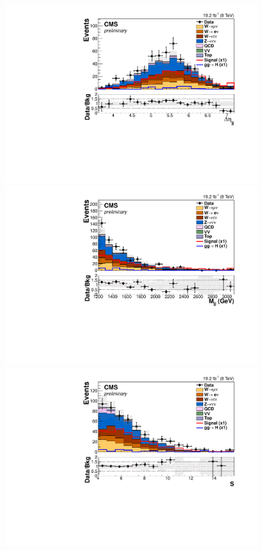 \begin{figure}
  \begin{center}
    \includegraphics[width=.65\largefigwidth]{plots/parked/HIG-14-038-figs/output_sigreg/nunu_dijet_deta.pdf}
    \includegraphics[width=.65\largefigwidth]{plots/parked/HIG-14-038-figs/output_sigreg/nunu_dijet_M.pdf}
    \includegraphics[width=.65\largefigwidth]{plots/parked/HIG-14-038-figs/output_sigreg/nunu_metnomu_significance.pdf}

\end{center}
\end{figure}
